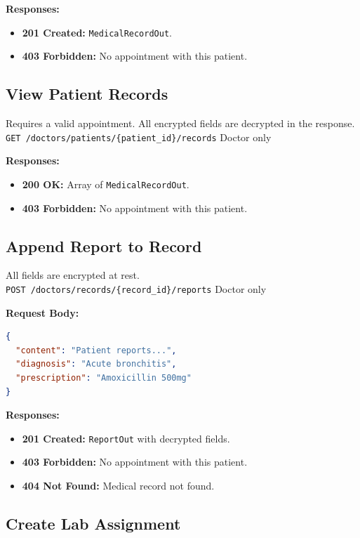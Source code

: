 \documentclass[a4paper,12pt]{report}
\begin{document}
\noindent\textbf{Responses:}
\begin{itemize}
    \item \textbf{201 Created:} \texttt{MedicalRecordOut}.
    \item \textbf{403 Forbidden:} No appointment with this patient.
\end{itemize}

\subsection{View Patient Records}

Requires a valid appointment. All encrypted fields are decrypted in the response. \\
\texttt{GET /doctors/patients/\{patient\_id\}/records} \hfill Doctor only

\noindent\textbf{Responses:}
\begin{itemize}
    \item \textbf{200 OK:} Array of \texttt{MedicalRecordOut}.
    \item \textbf{403 Forbidden:} No appointment with this patient.
\end{itemize}

\subsection{Append Report to Record}

All fields are encrypted at rest. \\
\texttt{POST /doctors/records/\{record\_id\}/reports} \hfill Doctor only

\noindent\textbf{Request Body:}
\begin{lstlisting}[language=json]
{
  "content": "Patient reports...",
  "diagnosis": "Acute bronchitis",
  "prescription": "Amoxicillin 500mg"
}
\end{lstlisting}

\noindent\textbf{Responses:}
\begin{itemize}
    \item \textbf{201 Created:} \texttt{ReportOut} with decrypted fields.
    \item \textbf{403 Forbidden:} No appointment with this patient.
    \item \textbf{404 Not Found:} Medical record not found.
\end{itemize}

\subsection{Create Lab Assignment}
\end{document}
